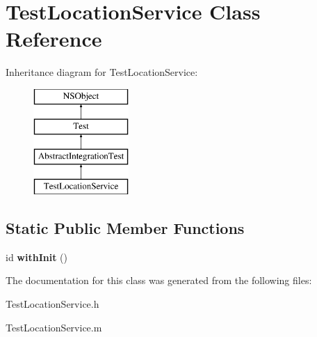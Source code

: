 \hypertarget{interface_test_location_service}{
\section{\-Test\-Location\-Service \-Class \-Reference}
\label{interface_test_location_service}
}
\-Inheritance diagram for \-Test\-Location\-Service\-:\begin{figure}[H]
\begin{center}
\leavevmode
\includegraphics[height=4.000000cm]{interface_test_location_service}
\end{center}
\end{figure}
\subsection*{\-Static \-Public \-Member \-Functions}
\begin{DoxyCompactItemize}
\item 
\hypertarget{interface_test_location_service_aaf28c09a0a44fad56548bcc9bfc8e5f0}{
id {\bfseries with\-Init} ()}
\label{interface_test_location_service_aaf28c09a0a44fad56548bcc9bfc8e5f0}

\end{DoxyCompactItemize}


\-The documentation for this class was generated from the following files\-:\begin{DoxyCompactItemize}
\item 
\-Test\-Location\-Service.\-h\item 
\-Test\-Location\-Service.\-m\end{DoxyCompactItemize}
